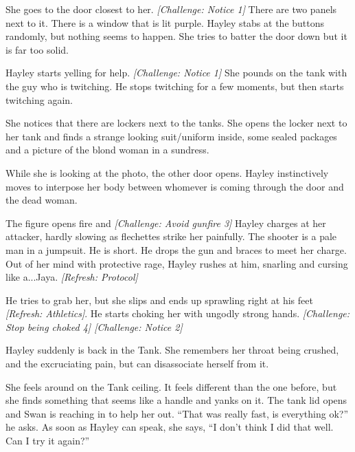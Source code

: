 She goes to the door closest to her.  \textit{{[}Challenge: Notice 1{]}}  There are two panels next to it.  There is a window that is lit purple.  Hayley stabs at the buttons randomly, but nothing seems to happen.  She tries to batter the door down but it is far too solid.



Hayley starts yelling for help. \textit{{[}Challenge: Notice 1{]}}  She pounds on the tank with the guy who is twitching.  He stops twitching for a few moments, but then starts twitching again.



She notices that there are lockers next to the tanks. She opens the locker next to her tank and finds a strange looking suit/uniform inside, some sealed packages and a picture of the blond woman in a sundress.



While she is looking at the photo, the other door opens.  Hayley instinctively moves to interpose her body between whomever is coming through the door and the dead woman.



The figure opens fire and \textit{{[}Challenge: Avoid gunfire 3{]}} Hayley charges at her attacker, hardly slowing as flechettes strike her painfully.  The shooter is a pale man in a jumpsuit.  He is short.  He drops the gun and braces to meet her charge.  Out of her mind with protective rage, Hayley rushes at him, snarling and cursing like a...Jaya.  \textit{{[}Refresh: Protocol{]}}



He tries to grab her, but she slips and ends up sprawling right at his feet \textit{{[}Refresh: Athletics{]}}.  He starts choking her with ungodly strong hands. \textit{{[}Challenge: Stop being choked 4{]}  {[}Challenge: Notice 2{]}}



Hayley suddenly is back in the Tank.  She remembers her throat being crushed, and the excruciating pain, but can disassociate herself from it.  



She feels around on the Tank ceiling.  It feels different than the one before, but she finds something that seems like a handle and yanks on it.  The tank lid opens and Swan is reaching in to help her out.  ``That was really fast, is everything ok?'' he asks.  As soon as Hayley can speak, she says, ``I don't think I did that well.  Can I try it again?''



